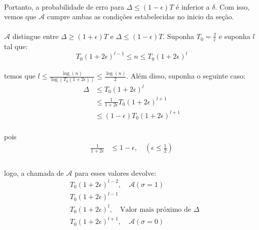 \paragraph{}Portanto, a probabilidade de erro para $\Delta \leq (1-\epsilon)T$ é inferior a $\delta$. Com isso, vemos que $\mathcal{A}$ cumpre ambas as condições estabelecidas no inicio da seção.
\paragraph{}$\mathcal{A}$ distingue entre $\Delta \geq (1+\epsilon)T$ e $\Delta \leq (1-\epsilon)T$. Suponha $T_0 =\frac{2}{\epsilon}$ e suponha $l$ tal que:
\begin{equation*}
    T_0(1 + 2\epsilon)^{l-1} \leq n \leq T_0(1 + 2\epsilon)^{l}
\end{equation*}
\paragraph{}temos que $l \leq \frac{\log(n)}{\log(T_0(1 + 2\epsilon))} \leq \frac{\log(n)}{2}$. Além disso, suponha o seguinte caso:
\begin{align*}
    \Delta &\leq T_0(1 + 2\epsilon)^l\\
   &\leq \frac{1}{1+2\epsilon}T_0(1+2\epsilon)^{l+1}\\ 
   &\leq (1-\epsilon)T_0(1+2\epsilon)^{l+1}
\end{align*}
\paragraph{}pois
\begin{align*}
    \frac{1}{1+2\epsilon} &\leq 1 - \epsilon, \quad (\epsilon \leq \frac{1}{2})\\
\end{align*}
\paragraph{}logo, a chamada de $\mathcal{A}$ para esses valores devolve:
\begin{align*}
    &T_0(1+2\epsilon)^{l - 2}, \quad \mathcal{A}(\sigma = 1)\\
    &T_0(1+2\epsilon)^{l - 1}\\
    &T_0(1+2\epsilon)^{l},\quad \text{Valor mais próximo de $\Delta$}\\
    &T_0(1+2\epsilon)^{l + 1}, \quad \mathcal{A}(\sigma = 0)\\
\end{align*}

